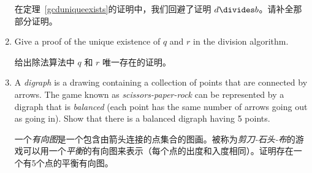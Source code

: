 \begin{enumerate}
    在定理~\ref{gcduniqueexists}的证明中，我们回避了证明 $d \divides b$。请补全那部分证明。
    
    
    \wbvfill
    
    \item Give a proof of the unique existence of $q$ and $r$ in the
    division algorithm.
    
    给出除法算法中 $q$ 和 $r$ 唯一存在的证明。
    
    \wbvfill
    
    \workbookpagebreak
    
    \item A \emph{digraph} is a drawing containing a collection of points
    that are connected by arrows.
    The game known as \emph{scissors-paper-rock}
    can be represented by a digraph that is \emph{balanced} (each point has the
    same number of arrows going out as going in).
    Show that there is a 
    balanced digraph having 5 points.
    
    一个\emph{有向图}是一个包含由箭头连接的点集合的图画。被称为\emph{剪刀-石头-布}的游戏可以用一个\emph{平衡}的有向图来表示（每个点的出度和入度相同）。证明存在一个有5个点的平衡有向图。
    \begin{center}
    
    \end{center}
      
    
    \wbvfill
    
    \workbookpagebreak
    
    \end{enumerate}